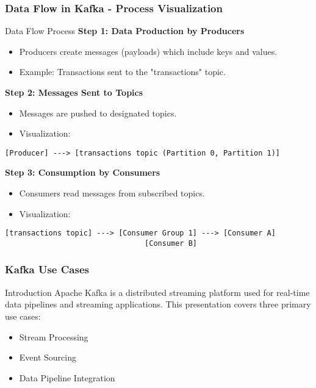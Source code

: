 \documentclass[aspectratio=169]{beamer}
\begin{document}
\begin{frame}[fragile]
    \frametitle{Data Flow in Kafka - Process Visualization}
    \begin{block}{Data Flow Process}
        \textbf{Step 1: Data Production by Producers}
        \begin{itemize}
            \item Producers create messages (payloads) which include keys and values.
            \item Example: Transactions sent to the "transactions" topic.
        \end{itemize}
        
        \textbf{Step 2: Messages Sent to Topics}
        \begin{itemize}
            \item Messages are pushed to designated topics.
            \item Visualization:
            \end{itemize}
            \begin{lstlisting}
[Producer] ---> [transactions topic (Partition 0, Partition 1)]
            \end{lstlisting}
        
        \textbf{Step 3: Consumption by Consumers}
        \begin{itemize}
            \item Consumers read messages from subscribed topics.
            \item Visualization:
            \end{itemize}
            \begin{lstlisting}
[transactions topic] ---> [Consumer Group 1] ---> [Consumer A]
                                [Consumer B]
            \end{lstlisting}
    \end{block}
\end{frame}

\begin{frame}[fragile]
    \frametitle{Kafka Use Cases}
    \begin{block}{Introduction}
        Apache Kafka is a distributed streaming platform used for real-time data pipelines and streaming applications. This presentation covers three primary use cases: 
        \begin{itemize}
            \item Stream Processing
            \item Event Sourcing
            \item Data Pipeline Integration
        \end{itemize}
    \end{block}
\end{frame}
\end{document}
